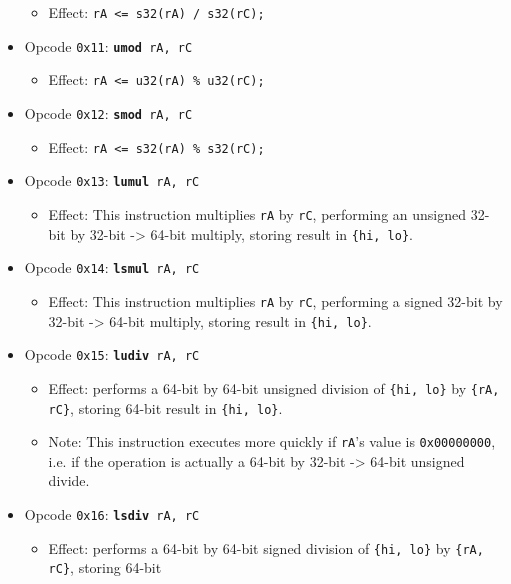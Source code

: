 \documentclass{article}
\begin{document}
\begin{itemize}
\begin{itemize}
			\item Effect: \texttt{rA <= s32(rA) / s32(rC);}
		\end{itemize}
		\item Opcode \texttt{0x11}:
			\texttt{\textbf{umod} rA, rC}
		\begin{itemize}
			\item Effect: \texttt{rA <= u32(rA) \% u32(rC);}
		\end{itemize}
		\item Opcode \texttt{0x12}:
			\texttt{\textbf{smod} rA, rC}
		\begin{itemize}
			\item Effect: \texttt{rA <= s32(rA) \% s32(rC);}
		\end{itemize}
		\item Opcode \texttt{0x13}:
			\texttt{\textbf{lumul} rA, rC}
		\begin{itemize}
			\item Effect: This instruction multiplies \texttt{rA} by
			\texttt{rC}, performing an unsigned 32-bit by 32-bit -> 64-bit
			multiply, storing result in \texttt{\{hi, lo\}}.
		\end{itemize}
		\item Opcode \texttt{0x14}:
			\texttt{\textbf{lsmul} rA, rC}
		\begin{itemize}
			\item Effect: This instruction multiplies \texttt{rA} by
			\texttt{rC}, performing a signed 32-bit by 32-bit -> 64-bit
			multiply, storing result in \texttt{\{hi, lo\}}.
		\end{itemize}
		\item Opcode \texttt{0x15}:
			\texttt{\textbf{ludiv} rA, rC}
		\begin{itemize}
			\item Effect: performs a 64-bit by 64-bit unsigned division of
			\texttt{\{hi, lo\}} by \texttt{\{rA, rC\}}, storing 64-bit
			result in \texttt{\{hi, lo\}}.
			\item Note: This instruction executes more quickly if
			\texttt{rA}'s value is \texttt{0x00000000}, i.e. if the
			operation is actually a 64-bit by 32-bit -> 64-bit unsigned
			divide.
		\end{itemize}
		\item Opcode \texttt{0x16}:
			\texttt{\textbf{lsdiv} rA, rC}
		\begin{itemize}
			\item Effect: performs a 64-bit by 64-bit signed division of
			\texttt{\{hi, lo\}} by \texttt{\{rA, rC\}}, storing 64-bit

\end{itemize}
\end{itemize}
\end{document}
